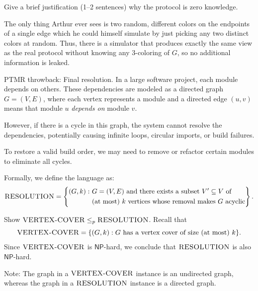\documentclass[12pt, letterpaper]{article}
\newcommand{\NP}{\mathsf{NP}}
\begin{document}
\begin{subproblem}{}
    Give a brief justification (1--2 sentences) why the protocol is zero knowledge.
\end{subproblem}
\begin{problemproof}
    The only thing Arthur ever sees is two random, different colors on the endpoints of a single edge which he could himself simulate by just picking any two distinct colors at random.  Thus, there is a simulator that produces exactly the same view as the real protocol without knowing any 3-coloring of \(G\), so no additional information is leaked.
\end{problemproof}
\newcommand{\RESOLUTION}{\textsc{RESOLUTION}}
\newcommand{\VC}{\textsc{VERTEX-COVER}}
\begin{problem}{PTMR throwback: Final resolution.}
    In a large software project, each module depends on others. These dependencies are modeled as a directed graph $G = (V,E)$, where each vertex represents a module and a directed edge $(u,v)$ means that module $u$ \emph{depends on} module $v$.

    However, if there is a cycle in this graph, the system cannot resolve the dependencies, potentially causing infinite loops, circular imports, or build failures. 

    To restore a valid build order, we may need to remove or refactor certain modules to eliminate all cycles.

    Formally, we define the language as:
\[
    \RESOLUTION = \left\{
    \begin{aligned}
    (G,k) :~ &\text{$G= (V,E)$ and there exists a subset $V'\subseteq V$ of }\\
    &\text{(at most) $k$ vertices whose removal makes $G$ acyclic}
    \end{aligned}
    \right\}.
\]

    Show $\VC \leq_p \RESOLUTION$. Recall that
    \[
        \VC = \{(G,k): \text{$G$ has a vertex cover of size (at most) $k$}\}.
    \]
     Since $\VC$ is $\NP$-hard, we conclude that $\RESOLUTION$ is also $\NP$-hard.

    Note: The graph in a $\VC$ instance is an undirected graph, whereas the graph in a $\RESOLUTION$ instance is a directed graph.
\end{problem}
\end{document}
